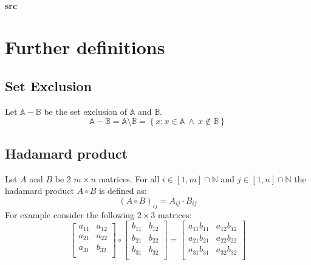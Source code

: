 \documentclass[12pt]{article}
\newcommand{\incDemo}[2]{\label{demo:#2}}
\begin{document}
\paragraph{src}																%


\section{Further definitions}
\subsection{Set Exclusion}
Let \(\mathbb A - \mathbb B\) be the set exclusion of \(\mathbb A\) and \(\mathbb B\).
\begin{equation}\label{eq:defs:SetExclusion}
\mathbb A - \mathbb B = \mathbb A \setminus \mathbb B = \left\{x: x\in\mathbb  A ~\wedge~ x \notin\mathbb B\right\}
\end{equation}
\subsection{Hadamard product}\label{sec:hadamerd_product}
Let \(A\) and \(B\) be 2 \(m \times n\) matrices. For all \(i \in [1, m]\cap\mathbb N\) and \(j \in [1, n]\cap\mathbb N\)
the hadamard product \(A \circ B\) is defined as:
\begin{equation} \label{eq:defs:Hadamard product}
\left(A \circ B\right)_{ij} = A_{ij} \cdot B_{ij}
\end{equation}
For example consider the following \(2 \times 3\) matrices:
\[
\left[
\begin{array}{ll}
a_{11} & a_{12} \\
a_{21} & a_{22} \\
a_{31} & b_{32} \\
\end{array}
\right] \circ 
\left[
\begin{array}{ll}
b_{11} & b_{12} \\
b_{21} & b_{22} \\
b_{31} & b_{32} \\
\end{array}
\right] = 
\left[
\begin{array}{ll}
a_{11}b_{11} & a_{12}b_{12} \\
a_{21}b_{21} & a_{22}b_{22} \\
a_{31}b_{31} & a_{32}b_{32} \\
\end{array}
\right]
\]
\end{document}
